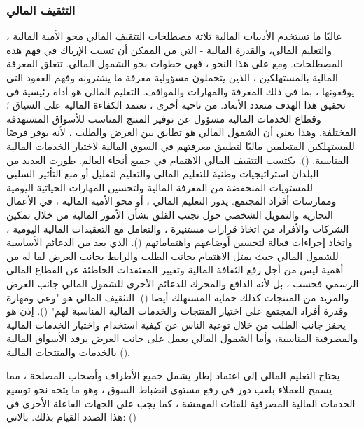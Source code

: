 \documentclass[10pt,a4paper]{report}
\begin{document}
\begin{doublespacing}
\subsubsection{التثقيف المالي}

غالبًا ما تستخدم الأدبيات المالية ثلاثة مصطلحات التثقيف المالي محو الأمية المالية ، والتعليم المالي، والقدرة المالية - التي من الممكن أن تسبب الإرباك في فهم هذه المصطلحات. ومع على هذا النحو ، فهي خطوات نحو الشمول المالي. تتعلق المعرفة المالية بالمستهلكين ، الذين يتحملون مسؤولية معرفة ما يشترونه وفهم العقود التي يوقعونها ، بما في ذلك المعرفة والمهارات والمواقف. التعليم المالي هو أداة رئيسية في تحقيق هذا الهدف متعدد الأبعاد. من ناحية أخرى ، تعتمد الكفاءة المالية على السياق ؛ وقطاع الخدمات المالية مسؤول عن توفير المنتج المناسب للأسواق المستهدفة المختلفة. وهذا يعني أن الشمول المالي هو تطابق بين العرض والطلب ، لأنه يوفر فرصًا للمستهلكين المتعلمين ماليًا لتطبيق معرفتهم في السوق المالية لاختيار الخدمات المالية المناسبة. (). يكتسب التثقيف المالي الاهتمام في جميع أنحاء العالم. طورت العديد من البلدان استراتيجيات وطنية للتعليم المالي والتعليم لتقليل أو منع التأثير السلبي للمستويات المنخفضة من المعرفة المالية ولتحسين المهارات الحياتية اليومية وممارسات أفراد المجتمع. يدور التعليم المالي ، أو محو الأمية المالية ، في الأعمال التجارية والتمويل الشخصي حول تجنب القلق بشأن الأمور المالية من خلال تمكين الشركات والأفراد من اتخاذ قرارات مستنيرة ، والتعامل مع التعقيدات المالية اليومية ، واتخاذ إجراءات فعالة لتحسين أوضاعهم واهتماماتهم (). الذي يعد من الدعائم الأساسية للشمول المالي حيث يمثل الاهتمام بجانب الطلب والرابط بجانب العرض لما له من أهمية ليس من أجل رفع الثقافة المالية وتغيير المعتقدات الخاطئة عن القطاع المالي الرسمي فحسب ، بل لأنه الدافع والمحرك للدعائم الأخرى للشمول المالي جانب العرض والمزيد من المنتجات كذلك حماية المستهلك أيضا (). التثقيف المالي هو "وعي ومهارة وقدرة أفراد المجتمع على اختيار المنتجات والخدمات المالية المناسبة لهم" (). إذن هو يحفز جانب الطلب من خلال توعية الناس عن كيفية استخدام واختيار الخدمات المالية والمصرفية المناسبة، وأما الشمول المالي يعمل على جانب العرض يرفد الأسواق المالية بالخدمات والمنتجات المالية ().

يحتاج التعليم المالي إلى اعتماد إطار يشمل جميع الأطراف وأصحاب المصلحة ، مما يسمح للعملاء بلعب دور في رفع مستوى انضباط السوق ، وهو ما يتجه نحو توسيع الخدمات المالية المصرفية للفئات المهمشة ، كما يجب على الجهات الفاعلة الأخرى في هذا الصدد القيام بذلك. بالاتي: ()


\end{doublespacing}
\end{document}
